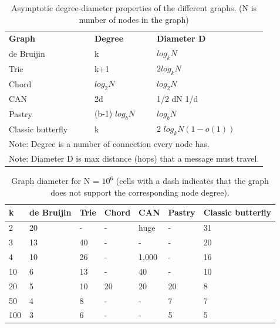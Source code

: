 \begin{table}[ht]
\centering
\caption{Asymptotic degree-diameter properties of the different graphs. (N is number of nodes in the graph)\cite{loguinov_graph-theoretic_2003}}
\label{structured-graph-performance}
\begin{tabular}{|l|l|l|}
\cline{1-3}
\textbf{Graph} & \textbf{Degree} & \textbf{Diameter D} \\ \cline{1-3}
de Bruijin & k & \(log_k N\) \\ \cline{1-3}
Trie & k+1 & \(2 log_k N\)  \\ \cline{1-3}
Chord & \(log_2 N\) & \(log_2 N\)  \\ \cline{1-3}
CAN & 2d & 1/2 dN 1/d \\ \cline{1-3}
Pastry & (b-1) \(log_b N\)  & \(log_b N\) \\ \cline{1-3}
Classic butterfly & k & 2 \(log_k N(1-o(1))\) \\ \cline{1-3}
\multicolumn{3}{|l|}{Note: Degree is a number of connection every node has.} \\ \hline
\multicolumn{3}{|l|}{Note: Diameter D is max distance (hops) that a message must travel.} \\ \hline
\end{tabular}
\end{table}

\begin{table}[ht]
\centering
\caption{Graph diameter for N = \(10^6\) (cells with a
dash indicates that the graph does not support the
corresponding node degree). \cite{loguinov_graph-theoretic_2003}}
\label{structured-graph-performance-2}
\begin{tabular}{|l|l|l|l|l|l|l|}
\hline
\textbf{k} & \textbf{de Bruijin} & \textbf{Trie} & \textbf{Chord} & \textbf{CAN} & \textbf{Pastry} & \textbf{Classic butterfly} \\ \hline
2 & 20 & - & - & huge & - & 31 \\ \hline
3 & 13 & 40 & - & - & - & 20 \\ \hline
4 & 10 & 26 & - & 1,000 & - & 16 \\ \hline
10 & 6 & 13 & - & 40 & - & 10 \\ \hline
20 & 5 & 10 & 20 & 20 & 20 & 8 \\ \hline
50 & 4 & 8 & - & - & 7 & 7 \\ \hline
100 & 3 & 6 & - & - & 5 & 5 \\ \hline
\end{tabular}
\end{table}

